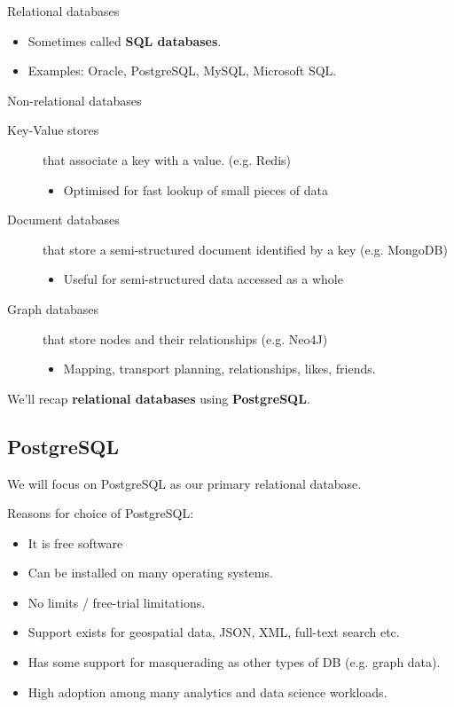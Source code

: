 \documentclass[slides]{pgnotes}
\begin{document}
\begin{greenbox}{Relational databases}
  \begin{itemize}
  \item Sometimes called \textbf{SQL databases}.
  \item Examples: Oracle, PostgreSQL, MySQL, Microsoft SQL.
  \end{itemize}
\end{greenbox}

\begin{bluebox}{Non-relational databases}
  \begin{description}
  \item[Key-Value stores] that associate a key with a value. (e.g. Redis)
    \begin{itemize}
    \item Optimised for fast lookup of small pieces of data
    \end{itemize}
  \item[Document databases] that store a semi-structured document identified by a key (e.g. MongoDB)
    \begin{itemize}
    \item Useful for semi-structured data accessed as a whole
    \end{itemize}
  \item[Graph databases] that store nodes and their relationships (e.g. Neo4J)
    \begin{itemize}
    \item Mapping, transport planning, relationships, likes, friends.
    \end{itemize}
  \end{description}
\end{bluebox}

We'll recap \textbf{relational databases} using \textbf{PostgreSQL}.

\subsection{PostgreSQL}\label{sec:postgresql}

We will focus on PostgreSQL as our primary relational database.


\begin{greenbox}{Reasons for choice of PostgreSQL:}
\begin{itemize}
\item
  It is free software
\item
  Can be installed on many operating systems.
\item
  No limits / free-trial limitations.
\item
  Support exists for geospatial data, JSON, XML, full-text search etc.
\item
  Has some support for masquerading as other types of DB (e.g. graph data).
\item
  High adoption among many analytics and data science workloads.
\end{itemize}
\end{greenbox}
\end{document}
